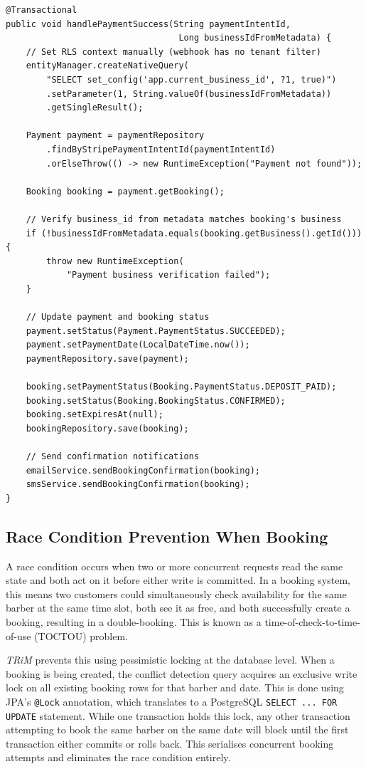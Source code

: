\begin{lstlisting}[caption={Webhook handler confirming a booking after successful deposit payment.}, label={lst:webhook-handler}]
@Transactional
public void handlePaymentSuccess(String paymentIntentId,
                                  Long businessIdFromMetadata) {
    // Set RLS context manually (webhook has no tenant filter)
    entityManager.createNativeQuery(
        "SELECT set_config('app.current_business_id', ?1, true)")
        .setParameter(1, String.valueOf(businessIdFromMetadata))
        .getSingleResult();

    Payment payment = paymentRepository
        .findByStripePaymentIntentId(paymentIntentId)
        .orElseThrow(() -> new RuntimeException("Payment not found"));

    Booking booking = payment.getBooking();

    // Verify business_id from metadata matches booking's business
    if (!businessIdFromMetadata.equals(booking.getBusiness().getId())) {
        throw new RuntimeException(
            "Payment business verification failed");
    }

    // Update payment and booking status
    payment.setStatus(Payment.PaymentStatus.SUCCEEDED);
    payment.setPaymentDate(LocalDateTime.now());
    paymentRepository.save(payment);

    booking.setPaymentStatus(Booking.PaymentStatus.DEPOSIT_PAID);
    booking.setStatus(Booking.BookingStatus.CONFIRMED);
    booking.setExpiresAt(null);
    bookingRepository.save(booking);

    // Send confirmation notifications
    emailService.sendBookingConfirmation(booking);
    smsService.sendBookingConfirmation(booking);
}
\end{lstlisting}

\subsection*{Race Condition Prevention When Booking}
A race condition occurs when two or more concurrent requests read the same state and both act on it before either write is committed. In a booking system, this means two customers could simultaneously check availability for the same barber at the same time slot, both see it as free, and both successfully create a booking, resulting in a double-booking. This is known as a time-of-check-to-time-of-use (TOCTOU) problem.

\textit{TRiM} prevents this using pessimistic locking at the database level. When a booking is being created, the conflict detection query acquires an exclusive write lock on all existing booking rows for that barber and date. This is done using JPA's \texttt{@Lock} annotation, which translates to a PostgreSQL \texttt{SELECT ... FOR UPDATE} statement. While one transaction holds this lock, any other transaction attempting to book the same barber on the same date will block until the first transaction either commits or rolls back. This serialises concurrent booking attempts and eliminates the race condition entirely.

